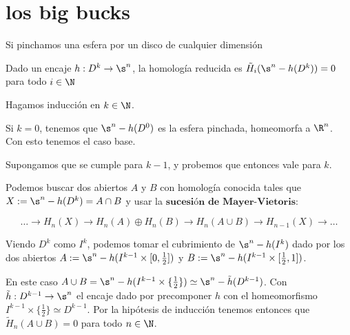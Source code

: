\section{los big bucks}

Si pinchamos una esfera por un disco de cualquier dimensión

\begin{teo}
    Dado un encaje $h:D^k\to \s^n$, la homología reducida es $\tilde{H}_i(\s^n - h(D^k))=0$ para todo $i\in\N$
\end{teo}


\begin{dem}
    Hagamos inducción en $k\in\N$. 
    
    Si $k=0$, tenemos que $\s^n - h(D^0)$ es la esfera pinchada, homeomorfa a $\R^n$. Con esto tenemos el caso base.

    Supongamos que se cumple para $k-1$, y probemos que entonces vale para $k$.

    Podemos buscar dos abiertos $A$ y $B$ con homología conocida tales que $X := \s^n-h(D^k) = A\cap B$ y usar la $\textbf{sucesión de}$ $\textbf{Mayer-Vietoris}$:

    $$\dots\rightarrow H_n(X)\rightarrow H_n(A)\oplus H_n(B)\rightarrow H_n(A\cup B)\rightarrow H_{n-1}(X)\rightarrow\dots$$
    
    Viendo $D^k$ como $I^k$, podemos tomar el cubrimiento de $\s^n-h(I^k)$ dado por los dos abiertos $A:=\s^n - h(I^{k-1}\times[0,\frac{1}{2}])$ y $B:=\s^n - h(I^{k-1}\times[\frac{1}{2},1])$.

    En este caso $A\cup B = \s^n-h(I^{k-1}\times\{\frac{1}{2}\})\simeq \s^n-\tilde{h}(D^{k-1})$. Con $\tilde{h}:D^{k-1}\to\s^n$ el encaje dado por precomponer $h$ con el homeomorfismo $I^{k-1}\times\{\frac{1}{2}\}\simeq D^{k-1}$. Por la hipótesis de inducción tenemos entonces que $\tilde{H}_n(A\cup B)=0$ para todo $n\in\N$.
    
 


    
\end{dem}